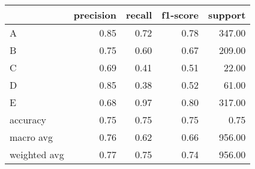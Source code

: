 \begin{tabular}{|l|r|r|r|r|}
\hline
{} &  precision &  recall &  f1-score &  support \\
\hline
A            &       0.85 &    0.72 &      0.78 &   347.00 \\
B            &       0.75 &    0.60 &      0.67 &   209.00 \\
C            &       0.69 &    0.41 &      0.51 &    22.00 \\
D            &       0.85 &    0.38 &      0.52 &    61.00 \\
E            &       0.68 &    0.97 &      0.80 &   317.00 \\
accuracy     &       0.75 &    0.75 &      0.75 &     0.75 \\
macro avg    &       0.76 &    0.62 &      0.66 &   956.00 \\
weighted avg &       0.77 &    0.75 &      0.74 &   956.00 \\
\hline
\end{tabular}
